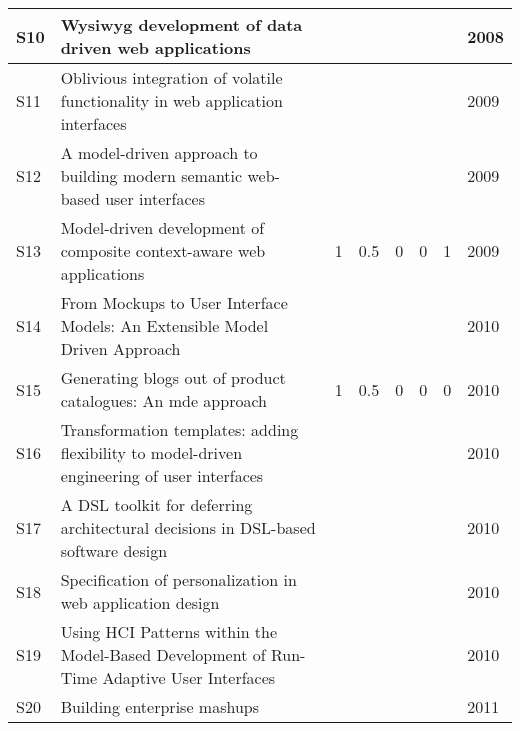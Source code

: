 \begin{table*}[ht!]
\begin{tabular}{ | p{0.3cm} | p{10.0cm} | p{0.7cm} |  p{0.7cm} | p{0.7cm} | p{0.7cm} | p{0.7cm}| p{0.7cm}|}
S10 &  Wysiwyg development of data driven web applications~\cite{Yang08}  &  & & & & & 2008 \\ \hline

S11 &  Oblivious integration of volatile functionality in web application interfaces~\cite{Ginzburg09}  &   & & & &  & 2009\\ \hline

S12 &  A model-driven approach to building modern semantic web-based user interfaces~\cite{chavarriaga2009model}  &  & & & &  & 2009 \\ \hline

S13 &  Model-driven development of composite context-aware web applications~\cite{KAPITSAKI20091244}  & 1 & 0.5 & 0 & 0 & 1  & 2009 \\ \hline		


S14 &  From Mockups to User Interface Models: An Extensible Model Driven Approach~\cite{Rivero10}  &  & & & & & 2010	\\ \hline 


S15 &  Generating blogs out of product catalogues: An mde approach~\cite{diaz2010generating}  & 1 & 0.5 & 0 & 0 & 0 & 2010 \\ \hline

S16 &  Transformation templates:  adding flexibility to model-driven engineering of user interfaces~\cite{Aquino10}  &  & & & &  & 2010 \\ \hline

S17 &  A DSL toolkit for deferring architectural decisions in DSL-based software design~\cite{ZDUN2010733}  &  & & & & & 2010 \\ \hline 

S18 & Specification of personalization in web application design~\cite{GARRIGOS2010991}	 &  & & & &  & 2010 \\ \hline	

S19 &  Using HCI Patterns within the Model-Based Development of Run-Time Adaptive User Interfaces~\cite{SEISSLER2010477}  &  & & & & & 2010 \\ \hline

S20 &  Building enterprise mashups~\cite{DEVRIEZE2011637}  &  & & & &  & 2011\\ \hline



\end{tabular}
\end{table*}
